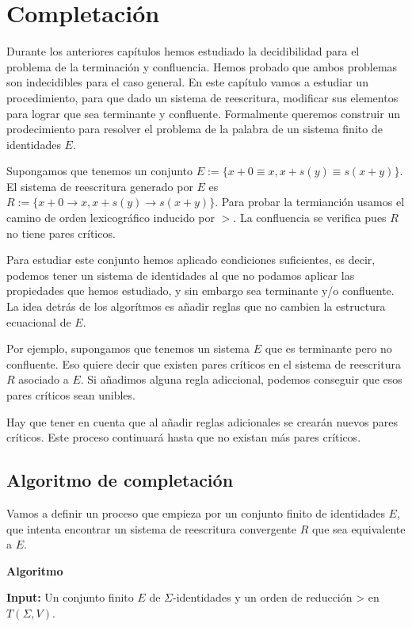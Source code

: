 \chapter{Completación}

Durante los anteriores capítulos hemos estudiado la decidibilidad para
el problema de la terminación y confluencia. Hemos probado que ambos
problemas son indecidibles para el caso general. En este capítulo
vamos a estudiar un procedimiento, para que dado un sistema de
reescritura, modificar sus elementos para lograr que sea terminante y
confluente. Formalmente queremos construir un prodecimiento para
resolver el problema de la palabra de un sistema finito de
identidades $E$.

Supongamos que tenemos un conjunto
$E := \{ x + 0 \equiv x, x + s(y) \equiv s(x+y) \}$. El sistema de
reescritura generado por $E$ es
$R := \{ x + 0 \rightarrow x, x + s(y) \rightarrow s(x+y)\}$.  Para
probar la termianción usamos el camino de orden lexicográfico inducido
por $>$. La confluencia se verifica pues $R$ no tiene pares críticos.

Para estudiar este conjunto hemos aplicado condiciones suficientes, es
decir, podemos tener un sistema de identidades al que no podamos
aplicar las propiedades que hemos estudiado, y sin embargo sea
terminante y/o confluente. La idea detrás de los algorítmos es añadir
reglas que no cambien la estructura ecuacional de $E$.

Por ejemplo, supongamos que tenemos un sistema $E$ que es terminante
pero no confluente. Eso quiere decir que existen pares críticos en el
sistema de reescritura $R$ asociado a $E$. Si añadimos alguna regla
adiccional, podemos conseguir que esos pares críticos sean unibles.

Hay que tener en cuenta que al añadir reglas adicionales se crearán
nuevos pares críticos. Este proceso continuará hasta que no existan
más pares críticos.

\section{Algoritmo de completación}

Vamos a definir un proceso que empieza por un conjunto finito de
identidades $E$, que intenta encontrar un sistema de reescritura
convergente $R$ que sea equivalente a $E$.

\textbf{Algoritmo} \hrulefill

\textbf{Input:} Un conjunto finito $E$ de $\Sigma$-identidades y un
orden de reducción > en $T(\Sigma, V)$.

